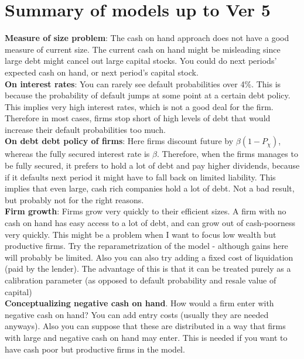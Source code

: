 \documentclass[12pt]{article}
\begin{document}
\section*{Summary of models up to Ver 5}

\textbf{Measure of size problem}: The cash on hand approach does not have a good measure of current size. The current cash on hand might be misleading since large debt might cancel out large capital stocks. You could do next periods' expected cash on hand, or next period's capital stock. \vspace{3mm} \\
\textbf{On interest rates}: You can rarely see default probabilities over 4\%. This is because the probability of default jumps at some point at a certain debt policy. This implies very high interest rates, which is not a good deal for the firm. Therefore in most cases, firms stop short of high levels of debt that would increase their default probabilities too much. \vspace{3mm} \\
\textbf{On debt debt policy of firms}: Here firms discount future by $\beta(1-P_\chi)$, whereas the fully secured interest rate is $\beta$. Therefore, when the firms manages to be fully secured, it prefers to hold a lot of debt and pay higher dividends, because if it defaults next period it might have to fall back on limited liability. This implies that even large, cash rich companies hold a lot of debt. Not a bad result, but probably not for the right reasons. \vspace{3mm} \\
\textbf{Firm growth}: Firms grow very quickly to their efficient sizes. A firm with no cash on hand has easy access to a lot of debt, and can grow out of cash-poorness very quickly. This might be a problem when I want to focus low wealth but productive firms. Try the reparametrization of the model - although gains here will probably be limited. Also you can also try adding a fixed cost of liquidation (paid by the lender). The advantage of this is that it can be treated purely as a calibration parameter (as opposed to default probability and resale value of capital) \vspace{3mm} \\
\textbf{Conceptualizing negative cash on hand}. How would a firm enter with negative cash on hand? You can add entry costs (usually they are needed anyways). Also you can suppose that these are distributed in a way that firms with large and negative cash on hand may enter. This is needed if you want to have cash poor but productive firms in the model. 
\setcounter{equation}{0}
\end{document}

